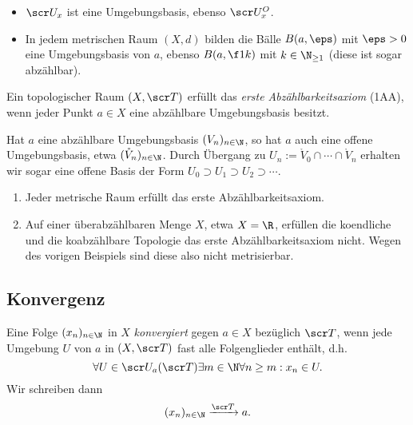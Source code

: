 \begin{ex}
	\begin{itemize}
		\item
			$\scr U_x$ ist eine Umgebungsbasis, ebenso $\scr U_x^O$.
		\item
			In jedem metrischen Raum $(X,d)$ bilden die Bälle $B(a,\eps)$ mit $\eps > 0$ eine Umgebungsbasis von $a$, ebenso $B(a, \f 1k)$ mit $k \in \N_{\ge 1}$ (diese ist sogar abzählbar).
	\end{itemize}
\end{ex}

\begin{df} \label{df:first_axiom_of_countability}
	Ein topologischer Raum $(X, \scr T)$ erfüllt das \emph{erste Abzählbarkeitsaxiom} (1AA), wenn jeder Punkt $a \in X$ eine abzählbare Umgebungsbasis besitzt.
	\begin{note}
		Hat $a$ eine abzählbare Umgebungsbasis $(V_n)_{n\in\N}$, so hat $a$ auch eine offene Umgebungsbasis, etwa $(\mathring V_n)_{n\in\N}$.
		Durch Übergang zu $U_n := \mathring V_0 \cap \dotsb \cap \mathring V_n$ erhalten wir sogar eine offene Basis der Form $U_0 \supset U_1 \supset U_2 \supset \dotsb$.
	\end{note}
\end{df}

\begin{ex}
	\begin{enumerate}[1.]
		\item
			Jeder metrische Raum erfüllt das erste Abzählbarkeitsaxiom.
		\item
			Auf einer überabzählbaren Menge $X$, etwa $X = \R$, erfüllen die koendliche und die koabzählbare Topologie das erste Abzählbarkeitsaxiom nicht.
			Wegen des vorigen Beispiels sind diese also nicht metrisierbar.
	\end{enumerate}
\end{ex}

\subsection{Konvergenz}

\begin{df}[Konvergenz]
	Eine Folge $(x_n)_{n\in \N}$ in $X$ \emph{konvergiert} gegen $a \in X$ bezüglich $\scr T$, wenn jede Umgebung $U$ von $a$ in $(X, \scr T)$ fast alle Folgenglieder enthält, d.h.
	\[
		\forall U \in \scr U_a(\scr T) \exists m \in \N \forall n \ge m : x_n \in U.
	\]
	Wir schreiben dann
	\[
		(x_n)_{n\in \N} \xrightarrow{\scr T} a.
	\]
\end{df}

